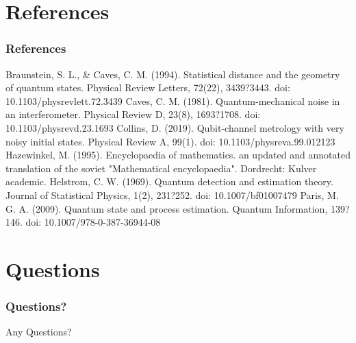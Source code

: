 \documentclass{beamer}
\begin{document}
\section{References}
\begin{frame}
\frametitle{References}
\footnotesize{
\begin{thebibliography}{99}
Braunstein, S. L., \& Caves, C. M. (1994). Statistical distance and the geometry of quantum states. Physical Review Letters, 72(22), 3439?3443. doi: 10.1103/physrevlett.72.3439
Caves, C. M. (1981). Quantum-mechanical noise in an interferometer. Physical Review D, 23(8), 1693?1708. doi: 10.1103/physrevd.23.1693
Collins, D. (2019). Qubit-channel metrology with very noisy initial states. Physical Review A, 99(1). doi: 10.1103/physreva.99.012123
Hazewinkel, M. (1995). Encyclopaedia of mathematics. an updated and annotated translation of the soviet "Mathematical encyclopaedia". Dordrecht: Kulver academic.
Helstrom, C. W. (1969). Quantum detection and estimation theory. Journal of Statistical Physics, 1(2), 231?252. doi: 10.1007/bf01007479
Paris, M. G. A. (2009). Quantum state and process estimation. Quantum Information, 139?146. doi: 10.1007/978-0-387-36944-08
\end{thebibliography}
}
\end{frame}
\section{Questions}
\begin{frame}
\frametitle{Questions?}
Any Questions?
\end{frame}
\end{document}
